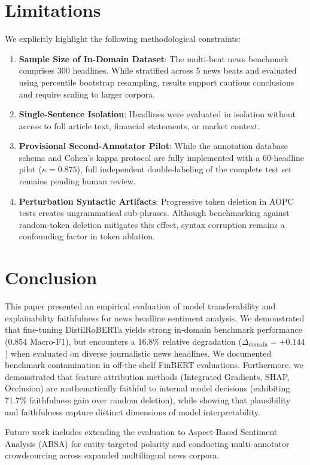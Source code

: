 \documentclass[10pt,twocolumn,letterpaper]{article}
\begin{document}
\section{Limitations}

We explicitly highlight the following methodological constraints:
\begin{enumerate}
    \item \textbf{Sample Size of In-Domain Dataset}: The multi-beat news benchmark comprises 300 headlines. While stratified across 5 news beats and evaluated using percentile bootstrap resampling, results support cautious conclusions and require scaling to larger corpora.
    \item \textbf{Single-Sentence Isolation}: Headlines were evaluated in isolation without access to full article text, financial statements, or market context.
    \item \textbf{Provisional Second-Annotator Pilot}: While the annotation database schema and Cohen's kappa protocol are fully implemented with a 60-headline pilot ($\kappa = 0.875$), full independent double-labeling of the complete test set remains pending human review.
    \item \textbf{Perturbation Syntactic Artifacts}: Progressive token deletion in AOPC tests creates ungrammatical sub-phrases. Although benchmarking against random-token deletion mitigates this effect, syntax corruption remains a confounding factor in token ablation.
\end{enumerate}

\section{Conclusion}

This paper presented an empirical evaluation of model transferability and explainability faithfulness for news headline sentiment analysis. We demonstrated that fine-tuning DistilRoBERTa yields strong in-domain benchmark performance (0.854 Macro-F1), but encounters a 16.8\% relative degradation ($\Delta_{\text{domain}} = +0.144$) when evaluated on diverse journalistic news headlines. We documented benchmark contamination in off-the-shelf FinBERT evaluations. Furthermore, we demonstrated that feature attribution methods (Integrated Gradients, SHAP, Occlusion) are mathematically faithful to internal model decisions (exhibiting 71.7\% faithfulness gain over random deletion), while showing that plausibility and faithfulness capture distinct dimensions of model interpretability.

Future work includes extending the evaluation to Aspect-Based Sentiment Analysis (ABSA) for entity-targeted polarity and conducting multi-annotator crowdsourcing across expanded multilingual news corpora.



\end{document}
